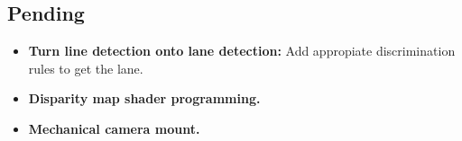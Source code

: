 \subsection{Pending}

\begin{itemize}
	\item \textbf{Turn line detection onto lane detection:} Add appropiate discrimination rules to get the lane.
	\item \textbf{Disparity map shader programming.}
	\item \textbf{Mechanical camera mount.}
\end{itemize}
